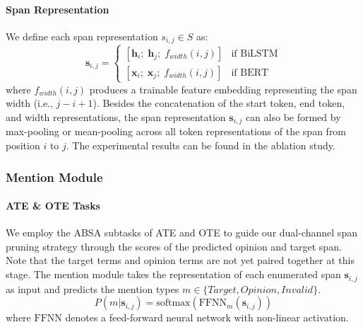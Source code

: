 \documentclass[11pt,a4paper]{article}
\begin{document}
\paragraph{Span Representation}
\label{representation}
We define each span representation $s_{i,j} \in S$ as:
\begin{equation}
\label{spanrep}
    \mathbf{s}_{i,j} =
\begin{cases} 
        [\mathbf{h}_i ; \; \mathbf{h}_j ;\;
f_{width}(i,j)]  & \text{if BiLSTM}
        \\
        [\mathbf{x}_i ; \; \mathbf{x}_j ;\;
f_{width}(i,j)]  & \text{if BERT}
    \end{cases}
\end{equation}
where $f_{width}(i,j)$ produces a trainable feature embedding representing the span width (i.e., $j - i + 1$).
Besides the concatenation of the start token, end token, and width representations,
the span representation $\mathbf{s}_{i,j}$ can also be formed by max-pooling or mean-pooling across all token representations of the span from position $i$ to $j$.  The experimental results can be found in the ablation study.




\subsubsection{Mention Module}
\label{mention_module}
\paragraph{ATE \& OTE Tasks}
We employ the ABSA subtasks of ATE and OTE to 
guide our dual-channel span pruning strategy through the scores of the predicted opinion and target span.
Note that the target terms and opinion terms are not yet paired together at this stage.  
The mention module takes the representation of each enumerated span  $\mathbf{s}_{i, j} $ as input and predicts the mention types $ m \in \{Target, Opinion, Invalid\} $.
\begin{equation}
\label{aux_task}
P(m|\mathbf{s}_{i, j}) = \mathrm{softmax}(\mathrm{FFNN}_m (\mathbf{s}_{i, j}))
\end{equation}
where $\mathrm{FFNN}$ denotes a feed-forward neural network with non-linear activation.
\end{document}
